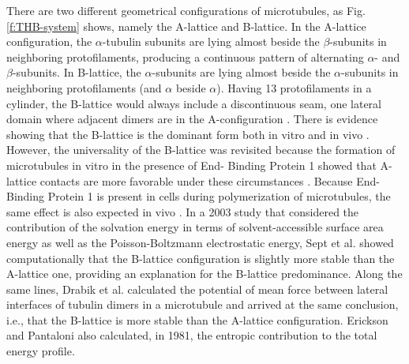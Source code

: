 \documentclass[11pt]{report}
\begin{document}
There are two different geometrical
configurations of microtubules,
as Fig. \ref{f:THB-system} shows,
namely the A-lattice and B-lattice. In the A-lattice configuration, the $\alpha$-tubulin subunits are lying almost beside the $\beta$-subunits in neighboring protofilaments, producing a continuous pattern of alternating $\alpha$- and $\beta$-subunits. In B-lattice, the $\alpha$-subunits are lying almost beside the $\alpha$-subunits in neighboring protofilaments (and $\alpha$ beside $\alpha$). Having 13 protofilaments in a cylinder, the B-lattice would always include a discontinuous seam, one lateral domain where adjacent dimers are in the A-configuration
\cite{McIntosh2009,Mandelkow1986}.
There is evidence showing that the B-lattice is the dominant form both in vitro and in vivo
\cite{Cohen1975,Mandelkow1977,WaisSteider1987,Mandelkow1995,Song1993}. 
However, the universality of the B-lattice was revisited because the formation of microtubules in vitro in the presence of End- Binding Protein 1 showed that A-lattice contacts are more favorable under these circumstances 
\cite{McIntosh2009,Georges2009,Vitre2008}. 
Because End-Binding Protein 1 is present in cells during polymerization of microtubules, the same effect is also expected in vivo \cite{McIntosh2009,Georges2009,Vitre2008}. 
In a 2003 study that considered the contribution of the solvation energy in terms of solvent-accessible surface area energy as well as the Poisson-Boltzmann electrostatic energy, Sept et al. \cite{Sept2003} showed computationally that the B-lattice configuration is slightly more stable than the A-lattice one, providing an explanation for the B-lattice predominance. Along the same lines, Drabik et al. 
\cite{Drabik2007} 
calculated the potential of mean force between lateral interfaces of tubulin dimers in a microtubule and arrived at the same conclusion, i.e., that the B-lattice is more stable than the A-lattice configuration. Erickson and Pantaloni
\cite{Erickson1981} 
also calculated, in 1981, the entropic contribution to the total energy profile.
\end{document}
